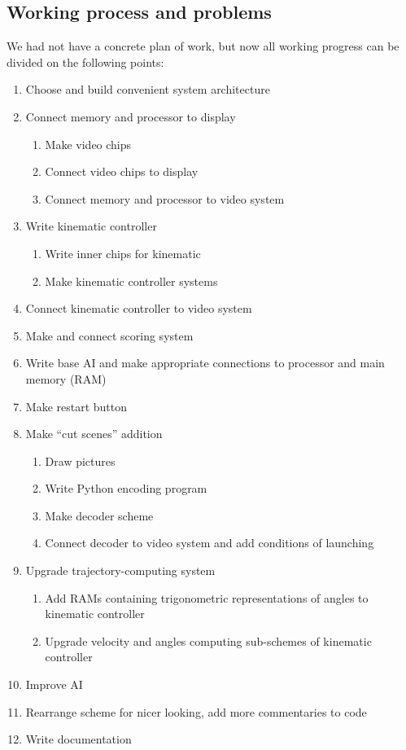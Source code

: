 \documentclass[12pt,a4paper]{article}
\begin{document}
    \subsection{Working process and problems}
    We had not have a concrete plan of work, but now all working progress can be divided on the following points:
    \begin{enumerate}
        \item Choose and build convenient system architecture
        \item Connect memory and processor to display\begin{enumerate}
            \item Make video chips
            \item Connect video chips to display
            \item Connect memory and processor to video system
        \end{enumerate}
        \item Write kinematic controller\begin{enumerate}
            \item Write inner chips for kinematic
            \item Make kinematic controller systems
        \end{enumerate}
        \item Connect kinematic controller to video system
        \item Make and connect scoring system
        \item Write base AI and make appropriate connections to processor and main memory (RAM)
        \item Make restart button
        \item Make “cut scenes” addition\begin{enumerate}
            \item Draw pictures
            \item Write Python encoding program
            \item Make decoder scheme
            \item Connect decoder to video system and add conditions of launching
        \end{enumerate}
        \item Upgrade trajectory-computing system \begin{enumerate}
            \item Add RAMs containing trigonometric representations of angles to kinematic controller
            \item Upgrade velocity and angles computing sub-schemes of kinematic controller
        \end{enumerate}
        \item Improve AI
        \item Rearrange scheme for nicer looking, add more commentaries to code
        \item Write documentation
    \end{enumerate}
\end{document}
